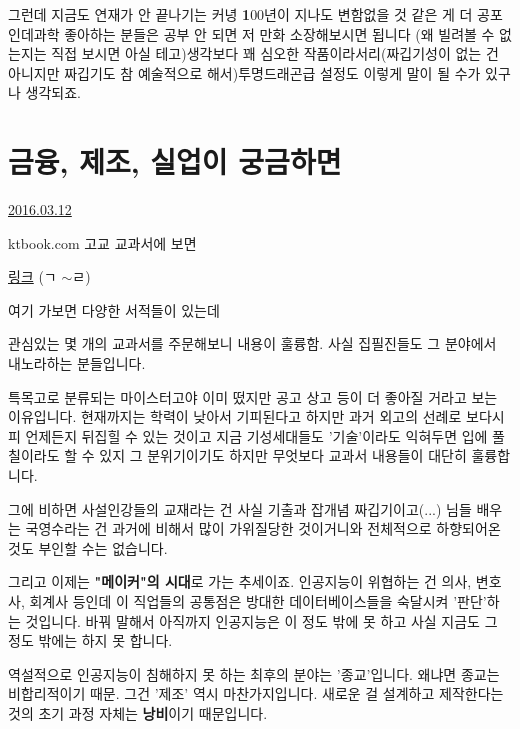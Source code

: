  그런데 지금도 연재가 안 끝나기는 커녕 
 \textbf{1}00년이 지나도 변함없을 것 같은 게 더 공포인데과학 좋아하는 분들은 공부 안 되면 저 만화 소장해보시면 됩니다
 (왜 빌려볼 수 없는지는 직접 보시면 아실 테고)생각보다 꽤 심오한 작품이라서리(짜깁기성이 없는 건 아니지만 짜깁기도 참 예술적으로 해서)투명드래곤급 설정도 이렇게 말이 될 수가 있구나 생각되죠.





\section{금융, 제조, 실업이 궁금하면}
\href{https://www.kockoc.com/Apoc/674055}{2016.03.12}

\vspace{5mm}

ktbook.com 고교 교과서에 보면
\vspace{5mm}

\href{http://www.ktbook.com/Shop/Online/BuyMainList.asp?BookGroup=61005&GroupName=전문교과}{링크} (ㄱ $\sim$ㄹ)
\vspace{5mm}

여기 가보면 다양한 서적들이 있는데
\vspace{5mm}

관심있는 몇 개의 교과서를 주문해보니 내용이 훌륭함.
사실 집필진들도 그 분야에서 내노라하는 분들입니다.
\vspace{5mm}

특목고로 분류되는 마이스터고야 이미 떴지만 공고 상고 등이 더 좋아질 거라고 보는 이유입니다.
현재까지는 학력이 낮아서 기피된다고 하지만 과거 외고의 선례로 보다시피 언제든지 뒤집힐 수 있는 것이고
지금 기성세대들도 '기술'이라도 익혀두면 입에 풀칠이라도 할 수 있지 그 분위기이기도 하지만
무엇보다 교과서 내용들이 대단히 훌륭합니다.
\vspace{5mm}

그에 비하면 사설인강들의 교재라는 건 사실 기출과 잡개념 짜깁기이고(...)
님들 배우는 국영수라는 건 과거에 비해서 많이 가위질당한 것이거니와 전체적으로 하향되어온 것도 부인할 수는 없습니다.
\vspace{5mm}

그리고 이제는 \textbf{"메이커"의 시대}로 가는 추세이죠.
인공지능이 위협하는 건 의사, 변호사, 회계사 등인데 이 직업들의 공통점은
방대한 데이터베이스들을 숙달시켜 '판단'하는 것입니다.
바꿔 말해서 아직까지 인공지능은 이 정도 밖에 못 하고 사실 지금도 그 정도 밖에는 하지 못 합니다.
\vspace{5mm}

역설적으로 인공지능이 침해하지 못 하는 최후의 분야는 '종교'입니다. 왜냐면 종교는 비합리적이기 때문.
그건 '제조' 역시 마찬가지입니다. 새로운 걸 설계하고 제작한다는 것의 초기 과정 자체는 \textbf{낭비}이기 때문입니다.
\vspace{5mm}

